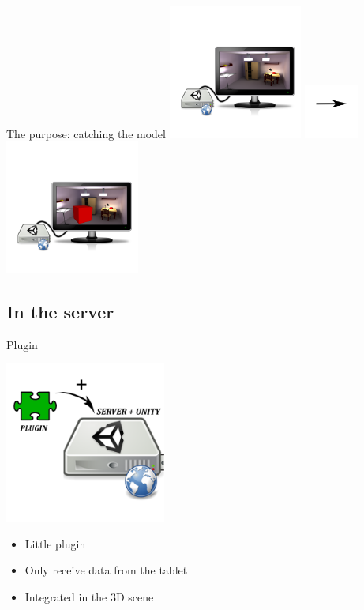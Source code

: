 \documentclass[a4paper,10pt]{beamer}
\begin{document}
			\begin{frame}{The purpose: catching the model}
				\includegraphics[height=125pt]{images/network/scenebefore.png}
				\includegraphics[height=50pt]{images/network/arrow.png}
				\includegraphics[height=125pt]{images/network/scene.png}
			\end{frame}
			
		\subsection{In the server}
			\begin{frame}{Plugin}
				\centerline{\includegraphics[height=150pt]{images/network/plugin.png}}
				\begin{itemize}	
					\item Little plugin
					\item Only receive data from the tablet
					\item Integrated in the 3D scene
				\end{itemize}	
											
			\end{frame}
			
\end{document}
